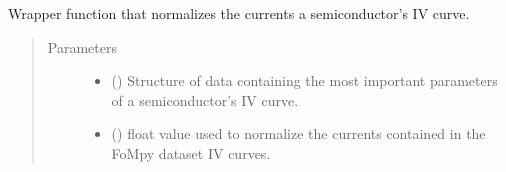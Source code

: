 \documentclass[letterpaper,10pt,english,openany, oneside]{sphinxmanual}
\begin{document}
\begin{fulllineitems}
\label{\detokenize{index:fompy.wrappers.normalize}}
Wrapper function that normalizes the currents a semiconductor’s IV curve.
\begin{quote}\begin{description}
\item[{Parameters}] \leavevmode\begin{itemize}
\item {} 
 () \textendash{} Structure of data containing the most important parameters of a semiconductor’s IV curve.

\item {} 
 () \textendash{} float value used to normalize the currents contained in the FoMpy dataset IV curves.

\end{itemize}

\end{description}\end{quote}

\end{fulllineitems}

\end{document}
